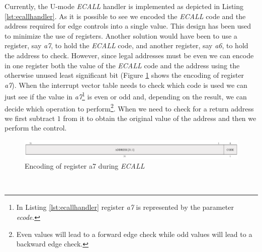 Currently, the U-mode \textit{ECALL} handler is implemented as depicted in Listing
\ref{lst:ecallhandler}. As it is possible to see we encoded the \textit{ECALL} code
and the address required for edge controls into a single value. This design has
been used to minimize the use of registers. Another solution would have been to use
a register, say \textit{a7}, to hold the \textit{ECALL} code, and another
register, say \textit{a6}, to hold the address to check. However, since legal addresses
must be even we can encode in one register both the value of the \textit{ECALL}
code and the address using the otherwise unused least significant bit (Figure \ref{fig:ecall}
shows the encoding of register \textit{a7}). When the interrupt vector table
needs to check which code is used we can just see if the value in \textit{a7}\footnote{In
Listing \ref{lst:ecallhandler} register \textit{a7} is represented by the parameter
\textit{ecode}.} is even or odd and, depending on the result, we can decide
which operation to perform\footnote{Even values will lead to a forward edge
check while odd values will lead to a backward edge check.}. When we need to
check for a return address we first subtract $1$ from it to obtain the original
value of the address and then we perform the control. \\
\begin{figure}[htbp]
  \centering
  \includegraphics[width=.9\linewidth]{images/ecall_code.png}
  \caption{Encoding of register a7 during \textit{ECALL}}
  \label{fig:ecall}
\end{figure}
\\

